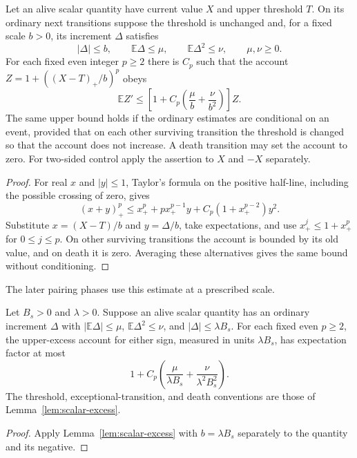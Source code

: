 \begin{lemma}\label{lem:scalar-excess}
Let an alive scalar quantity have current value $X$ and upper threshold
$T$.  On its ordinary next transitions suppose the threshold is unchanged
and, for a fixed scale $b>0$, its increment $\Delta$ satisfies
\[
 |\Delta|\le b,\qquad \mathbb E\Delta\le\mu,
 \qquad\mathbb E\Delta^2\le\nu,
 \qquad\mu,\nu\ge0.
\]
For each fixed even integer $p\ge2$ there is $C_p$ such that the account
$Z=1+((X-T)_+/b)^p$ obeys
\[
 \mathbb EZ'\le
 \left[1+C_p\left(\frac\mu b+\frac\nu{b^2}\right)\right]Z.
\]
The same upper bound holds if the ordinary estimates are conditional on
an event, provided that on each other surviving transition the threshold
is changed so that the account does not increase.  A death transition
may set the account to zero.  For two-sided control apply the assertion
to $X$ and $-X$ separately.
\end{lemma}

\begin{proof}
For real $x$ and $|y|\le1$, Taylor's formula on the positive half-line,
including the possible crossing of zero, gives
\[
 (x+y)_+^p\le x_+^p+p x_+^{p-1}y
       +C_p(1+x_+^{p-2})y^2.
\]
Substitute $x=(X-T)/b$ and $y=\Delta/b$, take expectations, and use
$x_+^j\le1+x_+^p$ for $0\le j\le p$.  On other surviving transitions the
account is bounded by its old value, and on death it is zero.  Averaging
these alternatives gives the same bound without conditioning.
\end{proof}

The later pairing phases use this estimate at a prescribed scale.

\begin{corollary}
\label{lem:positive-excess-account}
Let $B_s>0$ and $\lambda>0$. Suppose an alive scalar quantity has an ordinary increment $\Delta$
with $|\mathbb E\Delta|\le\mu$,
$\mathbb E\Delta^2\le\nu$, and $|\Delta|\le\lambda B_s$.
For each fixed even $p\ge2$, the upper-excess account for either
sign, measured in units $\lambda B_s$, has expectation factor at most
\begin{equation}
 1+C_p\left(\frac{\mu}{\lambda B_s}
             +\frac{\nu}{\lambda^2B_s^2}\right).
 \label{eq:original-34}
\end{equation}
The threshold, exceptional-transition, and death conventions are
those of Lemma~\ref{lem:scalar-excess}.
\end{corollary}
\begin{proof}
Apply Lemma~\ref{lem:scalar-excess} with $b=\lambda B_s$ separately
to the quantity and its negative.
\end{proof}

